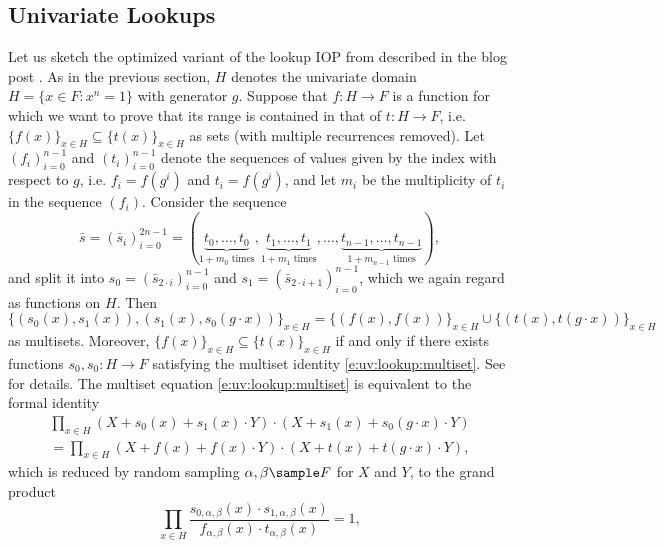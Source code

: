 \documentclass[11pt]{article}
\theoremstyle{definition}
\theoremstyle{remark}
\begin{document}
\subsection{Univariate Lookups}
\label{s:uv:lookup}

Let us sketch the optimized variant of the lookup IOP from \cite{Plookup} described in the blog post \cite{LookupsBlog}.
As in the previous section, $H$ denotes the univariate domain $H = \{x\in F: x^n = 1\}$ with generator $g$.
Suppose that $f:H\rightarrow F$ is  a function for which we want to prove that its range is contained in that of $t: H\rightarrow F$, i.e. $\{f(x)\}_{x\in H}\subseteq \{t(x)\}_{x\in H}$ as sets (with multiple recurrences removed).
Let $(f_i)_{i=0}^{n-1}$ and $(t_i)_{i=0}^{n-1}$ denote the sequences  of values given by the index with respect to $g$, i.e. $f_i= f(g^i)$ and $t_i=f(g^i)$, and let $m_i$ be the multiplicity of $t_i$ in the sequence $(f_i)$.
Consider the sequence
\[
\bar s = (\bar s_i)_{i=0}^{2n - 1} = (\underbrace{t_0, \ldots, t_0}_{1 + m_0 \text{ times}}, \underbrace{t_1, \ldots, t_1}_{1 + m_1 \text{ times}}, \ldots, \underbrace{t_{n-1}, \ldots, t_{n-1}}_{1 + m_{n-1} \text{ times}}),
\]
and split it into $s_0 = (\bar s_{2\cdot i})_{i=0}^{n-1}$ and  $s_1 = (\bar s_{2\cdot i+ 1})_{i=0}^{n-1}$, which we again regard as functions on $H$.
Then
\begin{equation}
\label{e:uv:lookup:multiset}
\{(s_0 (x), s_1(x)), (s_1(x), s_0(g\cdot x))\}_{x\in H} = \{ (f(x), f(x))\}_{x\in H} \cup \{(t(x), t(g\cdot x))\}_{x\in H}
\end{equation}
as multisets.
Moreover,  $\{f(x)\}_{x\in H}\subseteq \{t(x)\}_{x\in H}$ if and only if there exists functions $s_0, s_0: H\rightarrow F$ satisfying the multiset identity \eqref{e:uv:lookup:multiset}.
See  \cite{LookupsBlog} for details.
The multiset equation \eqref{e:uv:lookup:multiset} is equivalent to the formal identity
\begin{multline*}
\prod_{x\in H} (X + s_0(x) + s_1(x)\cdot Y)\cdot (X + s_1(x) + s_0(g\cdot x)\cdot Y) 
\\
= \prod_{x\in H} (X + f(x) + f(x)\cdot Y)\cdot (X + t(x) + t(g\cdot x)\cdot Y),
\end{multline*}
which is reduced by random sampling $\alpha, \beta\sample F$ for $X$ and $Y$, to the grand product
\begin{equation}
\label{e:UV:lookup:q}
\prod_{x\in H}  \frac{s_{0,\alpha,\beta}(x)\cdot s_{1,\alpha,\beta}(x)}{f_{\alpha,\beta}(x) \cdot t_{\alpha,\beta}(x)} = 1,
\end{equation}
\end{document}
